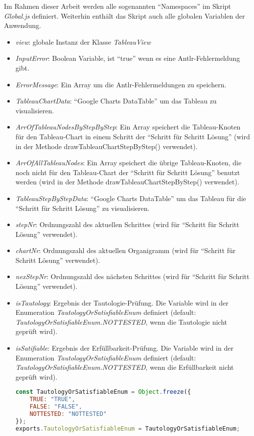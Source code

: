 Im Rahmen dieser Arbeit werden alle sogenannten ``Namespaces'' im Skript \textit{Global.js} definiert. Weiterhin enthält das Skript auch alle globalen Variablen der Anwendung.

\begin{itemize}
\item \textit{view}: globale Instanz der Klasse \textit{TableauView}
\item \textit{InputError}: Boolean Variable, ist ``true'' wenn es eine Antlr-Fehlermeldung gibt.
\item \textit{ErrorMessage}: Ein Array um die Antlr-Fehlermeldungen zu speichern.
\item \textit{TableauChartData}: ``Google Charts DataTable'' um das Tableau zu visualisieren.
\item \textit{ArrOfTableauNodesByStepByStep}: Ein Array speichert die Tableau-Knoten für den Tableau-Chart in einem Schritt der ``Schritt für Schritt Lösung'' (wird in der Methode drawTableauChartStepByStep() verwendet).
\item \textit{ArrOfAllTableauNodes}: Ein Array speichert die übrige Tableau-Knoten, die noch nicht für den Tableau-Chart der ``Schritt für Schritt Lösung'' benutzt werden (wird in der Methode drawTableauChartStepByStep() verwendet). 
\item \textit{TableauStepByStepData}: ``Google Charts DataTable'' um das Tableau für die ``Schritt für Schritt Lösung'' zu visualisieren.
\item \textit{stepNr}: Ordnungszahl des aktuellen Schrittes (wird für ``Schritt für Schritt Lösung'' verwendet).
\item \textit{chartNr}: Ordnungszahl des aktuellen Organigramm (wird für ``Schritt für Schritt Lösung'' verwendet).
\item \textit{nexStepNr}: Ordnungszahl des nächsten Schrittes (wird für ``Schritt für Schritt Lösung'' verwendet).
\item \textit{isTautology}:  Ergebnis der Tautologie-Prüfung. Die Variable wird in der Enumeration \textit{TautologyOrSatisfiableEnum} definiert (default: \textit{TautologyOrSatisfiableEnum.NOTTESTED}, wenn die Tautologie nicht geprüft wird).
\item \textit{isSatifiable}:   Ergebnis der	Erfüllbarkeit-Prüfung. Die Variable wird in der Enumeration \textit{TautologyOrSatisfiableEnum} definiert (default: \textit{TautologyOrSatisfiableEnum.NOTTESTED}, wenn die Erfüllbarkeit nicht geprüft wird).
\begin{lstlisting}[language=JavaScript, caption= TautologyOrSatisfiableEnum,basicstyle=\scriptsize]
const TautologyOrSatisfiableEnum = Object.freeze({
    TRUE: "TRUE",
    FALSE: "FALSE",
    NOTTESTED: "NOTTESTED"
});
exports.TautologyOrSatisfiableEnum = TautologyOrSatisfiableEnum;
\end{lstlisting}
\end{itemize}